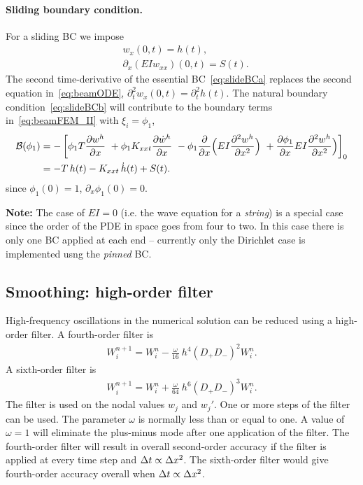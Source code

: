 \documentclass[11pt]{article}
\newcommand{\dt}{{\Delta t}}
\begin{document}
\paragraph{Sliding boundary condition.} For a sliding BC we impose
\begin{align}
&    w_{x}(0,t)=h(t),   \label{eq:slideBCa} \\
&   \partial_x( E I w_{xx})(0,t)=S(t) .\label{eq:slideBCb}
\end{align}
The second time-derivative of the essential BC~\eqref{eq:slideBCa} replaces the second equation in~\eqref{eq:beamODE},
$\partial_t^2 w_{x}(0,t)=\partial_t^2 h(t)$.
The natural boundary condition~\eqref{eq:slideBCb} will contribute to the boundary terms in~\eqref{eq:beamFEM_II}
with $\xi_i=\phi_1$, 
\begin{align}
   \mathcal{B}(\phi_1) &= -\left[ \phi_1 T \frac{\partial w^h}{\partial x} 
                      ~ + \phi_1 K_{xxt} \frac{\partial \dot w^h}{\partial x}  
                      ~ - \phi_1 \frac{\partial}{\partial x}\Big( E I \frac{\partial^2 w^h}{\partial x^2}\Big) 
                      ~ + \frac{\partial \phi_1}{\partial x}E I \frac{\partial^2 w^h}{\partial x^2}\Big)  
                      \right]_0  \\
     &=  -T \, h(t) - K_{xxt}\, \dot h(t) + S(t) . \label{eq:beam:pinned}
\end{align}
since $\phi_1(0)=1$, $\partial_x\phi_1(0)=0$.


\baselineskip
{\bf Note:} The case of $E I= 0$ (i.e. the wave equation for a {\em string}) 
is a special case since the order of the PDE in space goes from four to two. In this
case there is only one BC applied at each end -- currently only the Dirichlet case
is implemented usng the {\em pinned} BC. 


\subsection{Smoothing: high-order filter} \label{eq:BeamModel_FEM_SMOOTHER}

High-frequency oscillations in the numerical solution can be reduced using a 
high-order filter.
A fourth-order filter is 
\begin{align}
   W_i^{n+1}    = W_i^n - \frac{\omega}{16} ~ h^4 (D_+D_-)^2 W_i^n .
\end{align}
A sixth-order filter is 
\begin{align}
W_i^{n+1}    = W_i^n + \frac{\omega}{64} ~ h^6 (D_+D_-)^3 W_i^n .
\end{align}
The filter is used on the nodal values  $w_j$ and $w_j'$. 
One or more steps of the filter can be used. The parameter $\omega$ is normally less than or equal to one.
A value of $\omega=1$ will eliminate the plus-minus mode after one application of the filter.
The fourth-order filter will result in overall second-order accuracy if the filter is applied at every
time step and $\dt \propto \dx^2$. The sixth-order filter would give fourth-order accuracy overall when $\dt \propto \dx^2$.
\end{document}
